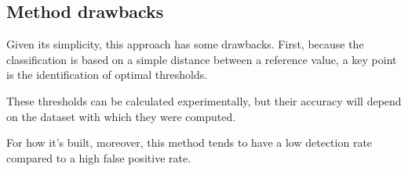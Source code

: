 \subsection{Method drawbacks}

Given its simplicity, this approach has some drawbacks. First, because the classification is based on a simple distance between a reference value, a key point is the identification of optimal thresholds.

These thresholds can be calculated experimentally, but their accuracy will depend on the dataset with which they were computed.

For how it's built, moreover, this method tends to have a low detection rate compared to a high false positive rate.